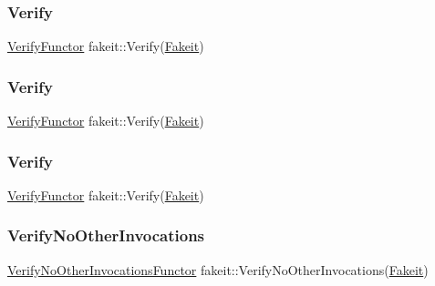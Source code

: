 \subsubsection{\texorpdfstring{Verify}{Verify}\hspace{0.1cm}{\footnotesize\ttfamily [7/9]}}
{\footnotesize\ttfamily \mbox{\hyperlink{classfakeit_1_1VerifyFunctor}{Verify\+Functor}} fakeit\+::\+Verify(\mbox{\hyperlink{single__header_2tpunit_2fakeit_8hpp_a2b1f324059bec9d07841630bd5c2e7bc}{Fakeit}})\hspace{0.3cm}{\ttfamily [static]}}

\mbox{\label{namespacefakeit_a98461e1563bebcff90de1ab7871edfef}} 
\subsubsection{\texorpdfstring{Verify}{Verify}\hspace{0.1cm}{\footnotesize\ttfamily [8/9]}}
{\footnotesize\ttfamily \mbox{\hyperlink{classfakeit_1_1VerifyFunctor}{Verify\+Functor}} fakeit\+::\+Verify(\mbox{\hyperlink{single__header_2tpunit_2fakeit_8hpp_a2b1f324059bec9d07841630bd5c2e7bc}{Fakeit}})\hspace{0.3cm}{\ttfamily [static]}}

\mbox{\label{namespacefakeit_a98461e1563bebcff90de1ab7871edfef}} 
\subsubsection{\texorpdfstring{Verify}{Verify}\hspace{0.1cm}{\footnotesize\ttfamily [9/9]}}
{\footnotesize\ttfamily \mbox{\hyperlink{classfakeit_1_1VerifyFunctor}{Verify\+Functor}} fakeit\+::\+Verify(\mbox{\hyperlink{single__header_2tpunit_2fakeit_8hpp_a2b1f324059bec9d07841630bd5c2e7bc}{Fakeit}})\hspace{0.3cm}{\ttfamily [static]}}

\mbox{\label{namespacefakeit_a1fdaffe6f7ef1789d8ef832cc4cc19c3}} 
\subsubsection{\texorpdfstring{VerifyNoOtherInvocations}{VerifyNoOtherInvocations}\hspace{0.1cm}{\footnotesize\ttfamily [1/9]}}
{\footnotesize\ttfamily \mbox{\hyperlink{classfakeit_1_1VerifyNoOtherInvocationsFunctor}{Verify\+No\+Other\+Invocations\+Functor}} fakeit\+::\+Verify\+No\+Other\+Invocations(\mbox{\hyperlink{single__header_2tpunit_2fakeit_8hpp_a2b1f324059bec9d07841630bd5c2e7bc}{Fakeit}})\hspace{0.3cm}{\ttfamily [static]}}

